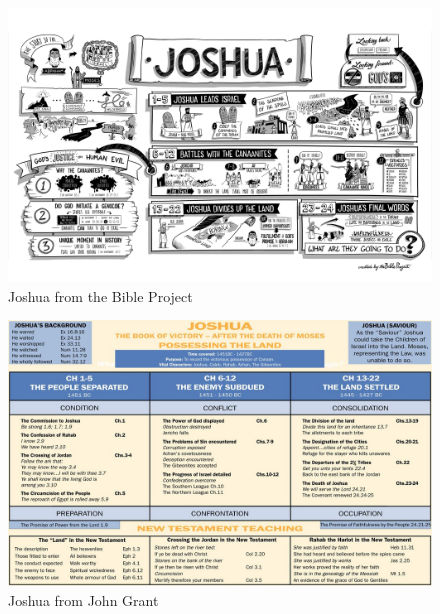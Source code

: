 

\newpage
\begin{figure}
\begin{center}
\includegraphics[scale=0.5, angle=90]{06OT-Joshua/References/1.BibleProject-Joshua.jpg}
\caption[Joshua from the Bible Project]{Joshua from the Bible Project}
\label{fig:Joshua from the Bible Project}
\end{center}
\end{figure}

\newpage
\begin{figure}
\begin{center}
\includegraphics[scale=0.5, angle=90]{06OT-Joshua/References/2.JohnGrant-Joshua.jpg}
\caption[Joshua from John Grant]{Joshua from John Grant}
\label{fig:Joshua from John Grant}
\end{center}
\end{figure}

